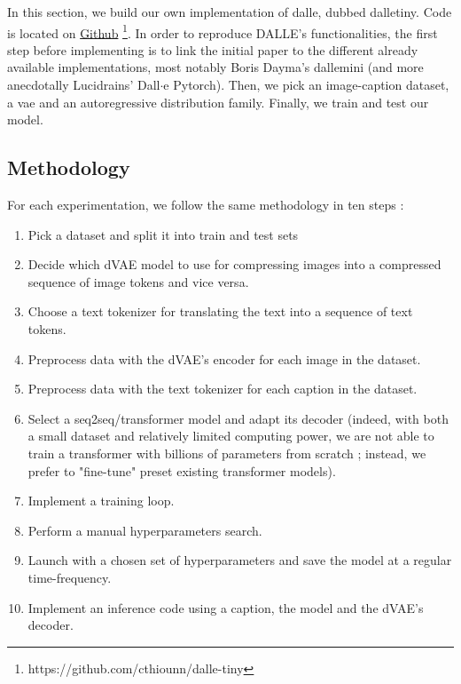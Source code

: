 \documentclass{article}
\begin{document}
\begin{multicols}{2}

In this section, we build our own implementation of \gls{dalle}, dubbed \gls{dalletiny}. Code is located on \href{https://github.com/cthiounn/dalle-tiny}{Github} \footnote{https://github.com/cthiounn/dalle-tiny}. In order to reproduce DALLE's functionalities, the first step before implementing is to link the initial paper to the different already available implementations, most notably Boris Dayma's \gls{dallemini} (and more anecdotally Lucidrains' Dall$\cdot$e Pytorch). Then, we pick an image-caption dataset, a \gls{vae} and an autoregressive distribution family. Finally, we train and test our model.

\subsection{Methodology}

For each experimentation, we follow the same methodology in ten steps :

\begin{enumerate}
\item Pick a dataset and split it into train and test sets
    \item Decide which dVAE model to use for compressing images into a compressed sequence of image tokens and vice versa.
    \item Choose a text tokenizer for translating the text into a sequence of text tokens.
    \item Preprocess data with the dVAE's encoder for each image in the dataset.
    \item Preprocess data with the text tokenizer for each caption in the dataset.
    \item Select a seq2seq/transformer model and adapt its decoder (indeed, with both a small dataset and relatively limited computing power, we are not able to train a transformer with billions of parameters from scratch ; instead, we prefer to "fine-tune" preset existing transformer models).
    \item Implement a training loop.
    \item Perform a manual hyperparameters search.
    \item Launch with a chosen set of hyperparameters and save the model at a regular time-frequency.
    \item Implement an inference code using a caption, the model and the dVAE's decoder.
\end{enumerate}


\end{multicols}
\end{document}
